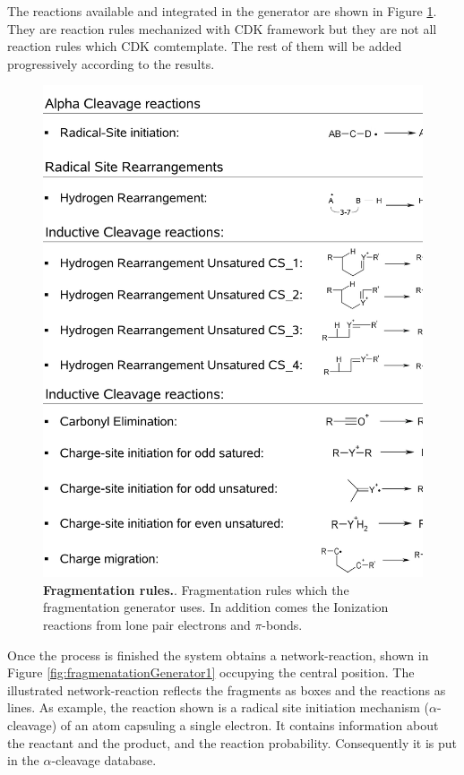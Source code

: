 \documentclass[10pt]{bmc_article}
\newenvironment{bmcformat}{\begin{raggedright}\baselineskip20pt\sloppy\setboolean{publ}{false}}{\end{raggedright}\baselineskip20pt\sloppy}
\begin{document}
\begin{bmcformat}
The reactions available and integrated in the generator are shown in Figure 
\ref{fig:reactionSetps}. They are reaction rules mechanized with CDK\cite{cdk2002} 
framework but they are not all reaction rules which CDK comtemplate. The rest 
of them will be added progressively according to the results.


\begin{figure}[htp]
\begin{center}
\includegraphics[scale=0.57]{figures/reactionTypes.pdf} 
\caption[Fragmentation rules.]{{\bf{Fragmentation rules.}}. Fragmentation rules 
which the fragmentation generator uses. In addition comes the Ionization 
reactions from lone pair electrons and $\pi$-bonds.}
\end{center}
\label{fig:reactionSetps}
\end{figure}

Once the process is finished the system obtains a network-reaction, shown in 
Figure \ref{fig:fragmenatationGenerator1} occupying the central position. The 
illustrated network-reaction reflects the fragments as boxes and the reactions 
as lines. As example, the reaction shown is a radical site initiation mechanism 
($\alpha$-cleavage) of an atom capsuling a single electron. It contains 
information about the reactant and the product, and the reaction probability. 
Consequently it is put in the $\alpha$-cleavage database.


\end{bmcformat}
\end{document}
